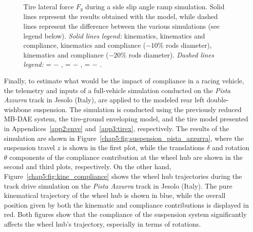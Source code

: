 \begin{figure}[!htp]
  \centering
  \small{}
  \caption{Tire lateral force $F_y$ during a side slip angle ramp simulation. Solid lines represent the results obtained with the \Simulink{} model, while dashed lines represent the difference between the various simulations (see legend below). \emph{Solid lines legend:}
  {\color{mycolor1}\raisebox{-.15pt}{$\blacksquare$}} kinematics, {\color{mycolor2}\raisebox{-.15pt}{$\blacksquare$}} kinematics and compliance, {\color{mycolor3}\raisebox{-.15pt}{$\blacksquare$}} kinematics and compliance ($-10\%$ rods diameter), {\color{mycolor5}\raisebox{-.15pt}{$\blacksquare$}} kinematics and compliance ($-20\%$ rods diameter).   \emph{Dashed lines legend:} {\color{mycolor1}\raisebox{-.15pt}{\scalebox{0.5}[1.0]{$\blacksquare$}}}{\color{mycolor2}\raisebox{-.15pt}{\scalebox{0.5}[1.0]{$\blacksquare$}}} = {\color{mycolor1}\raisebox{-.15pt}{$\blacksquare$}} $-$ {\color{mycolor2}\raisebox{-.15pt}{$\blacksquare$}}, {\color{mycolor1}\raisebox{-.15pt}{\scalebox{0.5}[1.0]{$\blacksquare$}}}{\color{mycolor3}\raisebox{-.15pt}{\scalebox{0.5}[1.0]{$\blacksquare$}}} = {\color{mycolor1}\raisebox{-.15pt}{$\blacksquare$}} $-$ {\color{mycolor3}\raisebox{-.15pt}{$\blacksquare$}},  {\color{mycolor1}\raisebox{-.15pt}{\scalebox{0.5}[1.0]{$\blacksquare$}}}{\color{mycolor5}\raisebox{-.15pt}{\scalebox{0.5}[1.0]{$\blacksquare$}}} = {\color{mycolor1}\raisebox{-.15pt}{$\blacksquare$}} $-$ {\color{mycolor5}\raisebox{-.15pt}{$\blacksquare$}}.
  }
  \label{chap5:fig:test_bench}
\end{figure}

Finally, to estimate what would be the impact of compliance in a racing vehicle, the telemetry and inputs of a full-vehicle simulation conducted on the \textit{Pista Azzurra} track in Jesolo (Italy), are applied to the modeled rear left double-wishbone suspension. The simulation is conducted using the previously reduced \ac{MB}-\ac{DAE} system, the tire-ground enveloping model, and the tire model presented in Appendices~\ref{app2:enve} and~\ref{app3:tirex}, respectively. The results of the simulation are shown in Figure~\ref{chap5:fig:suspension_pista_azzurra}, where the suspension travel $z$ is shown in the first plot, while the translations $\delta$ and rotation $\theta$ components of the compliance contribution at the wheel hub are shown in the second and third plots, respectively. On the other hand, Figure~\ref{chap5:fig:kine_compliance} shows the wheel hub trajectories during the track drive simulation on the \textit{Pista Azzurra} track in Jesolo (Italy). The pure kinematical trajectory of the wheel hub is shown in blue, while the overall position given by both the kinematic and compliance contributions is displayed in red. Both figures show that the compliance of the suspension system significantly affects the wheel hub's trajectory, especially in terms of rotations.

